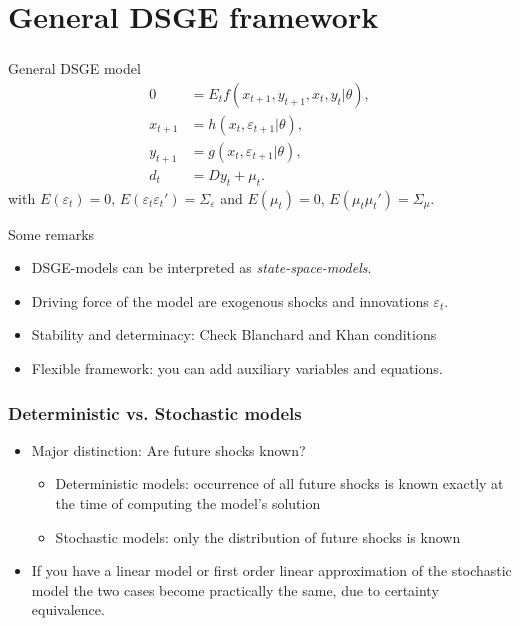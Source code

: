 \documentclass[handout]{beamer}  %
\begin{document}
\section{General DSGE framework}

\begin{frame}
	\frametitle{\secname}
	
	\begin{block}{General DSGE model}
		\begin{align*}
		0 &=   E_t f \left( x_{t+1},y_{t+1},x_t,y_t|\theta \right),\\
		x_{t+1}  &= h(x_{t},\varepsilon_{t+1}|\theta),\\
		y_{t+1} &= g(x_t,\varepsilon_{t+1}|\theta) ,\\
		d_t &= D y_t+  \mu_{t}.
		\end{align*}
		with $E(\varepsilon_t)=0$, $E(\varepsilon_t\varepsilon_t')=\Sigma_\varepsilon$ and $E(\mu_t)=0$, $E(\mu_t\mu_t')=\Sigma_\mu$.
	\end{block}
	Some remarks
	\begin{itemize}
		\item  DSGE-models can be interpreted as \emph{state-space-models}.
		\item Driving force of the model are exogenous shocks and innovations $\varepsilon_t$.
		\item Stability and determinacy: Check Blanchard and Khan conditions
		\item Flexible framework: you can add auxiliary variables and equations.
	\end{itemize}
\end{frame}


\begin{frame}\frametitle{Deterministic vs. Stochastic models}
	\begin{itemize}
		\item Major distinction: Are future shocks known?
		\begin{itemize}
			\item Deterministic models: occurrence of all future shocks is known exactly at the time of computing the model's solution
			\item Stochastic models: only the distribution of future shocks is known			
		\end{itemize}
\item If you have a linear model or first order linear approximation of the stochastic model the two cases become practically the same, due to certainty equivalence.			
	\end{itemize}
\end{frame}
\end{document}
